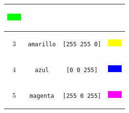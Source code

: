 \begin{center}
\begin{longtable}{|*{4}{c|}}
\begin{minipage}[m]{1.5cm}
\begin{center}
                \vspace{0.2cm} %
              \includegraphics{Imagenes/05_Primitivas/02_verde.png}
                \vspace{0.2cm} \end{center} \end{minipage} \\ \hline
    3 & \texttt{amarillo} \index{amarillo@\texttt{amarillo}}
      & \texttt{[255 255  0]} &  \begin{minipage}[m]{1.5cm} \begin{center}
               \vspace{0.2cm} %
              \includegraphics{Imagenes/05_Primitivas/03_amarillo.png}
               \vspace{0.2cm} \end{center} \end{minipage} \\ \hline
    4 & \texttt{azul} \index{azul@\texttt{azul}}
      & \texttt{[0   0  255]} & \begin{minipage}[m]{1.5cm} \begin{center}
                 \vspace{0.2cm} %
              \includegraphics{Imagenes/05_Primitivas/04_azul.png}
                 \vspace{0.2cm} \end{center} \end{minipage} \\ \hline
    5 & \texttt{magenta} \index{magenta@\texttt{magenta}}
      & \texttt{[255  0  255]} & \begin{minipage}[m]{1.5cm} \begin{center}
              \vspace{0.2cm} %
              \includegraphics{Imagenes/05_Primitivas/05_magenta.png}
              \vspace{0.2cm} \end{center} \end{minipage} \\ \hline

\end{longtable}
\end{center}
